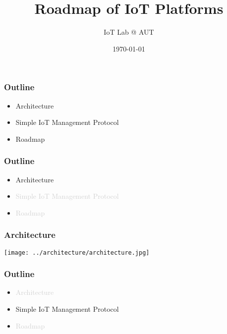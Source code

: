 \documentclass{beamer}
\title[CoAP middle server for IoT platform]{Roadmap of IoT Platforms}
\author{IoT Lab @ AUT}
\institute[] {
  Amirkabir University of Technology
}
\date{\today}
\begin{document}
\begin{frame}
\titlepage
\end{frame}


\begin{frame}
	\frametitle{Outline}
	\vspace{.1cm}
	\begin{itemize}
		\justifying
		\item Architecture
		\item<2-> Simple IoT Management Protocol
		\item<3-> Roadmap
	\end{itemize}
\end{frame}

\begin{frame}
	\frametitle{Outline}
	\vspace{.1cm}
	\begin{itemize}
		\justifying
		\item Architecture
		\item \textcolor{LightGray}{Simple IoT Management Protocol}
		\item \textcolor{LightGray}{Roadmap}
	\end{itemize}
\end{frame}

\begin{frame}
	\frametitle{Architecture}
	\vspace{.1cm}
	\hspace*{.75cm} \texttt{[image: ../architecture/architecture.jpg]}
\end{frame}

\begin{frame}
	\frametitle{Outline}
	\vspace{.1cm}
	\begin{itemize}
		\justifying
		\item \textcolor{LightGray}{Architecture}
		\item Simple IoT Management Protocol
		\item \textcolor{LightGray}{Roadmap}
	\end{itemize}
\end{frame}
\end{document}
